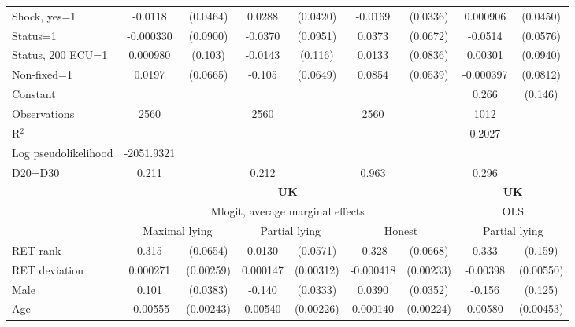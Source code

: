 \begin{tabular}{l|cccccc|cc}
Shock, yes=1    &  -0.0118         & (0.0464)&   0.0288         & (0.0420)&  -0.0169         & (0.0336)& 0.000906         & (0.0450)\\
Status=1        &-0.000330         & (0.0900)&  -0.0370         & (0.0951)&   0.0373         & (0.0672)&  -0.0514         & (0.0576)\\
Status, 200 ECU=1& 0.000980         &  (0.103)&  -0.0143         &  (0.116)&   0.0133         & (0.0836)&  0.00301         & (0.0940)\\
Non-fixed=1     &   0.0197         & (0.0665)&   -0.105         & (0.0649)&   0.0854         & (0.0539)&-0.000397         & (0.0812)\\
Constant        &                  &         &                  &         &                  &         &    0.266\sym{*}  &  (0.146)\\
\hline
Observations    &     2560         &         &     2560         &         &     2560         &         &     1012         &         \\
R$^2$      &                  &         &                  &         &                  &         &     0.2027      &   \\ 
Log pseudolikelihood  & -2051.9321   &         &                  &         &                  &         &           &   \\ 
D20=D30         &    0.211         &         &    0.212         &         &    0.963         &         &    0.296         &         \\
\hline\hline
&\multicolumn{6}{c|}{\bf UK}&\multicolumn{2}{c}{\bf UK}\\ &\multicolumn{6}{c|}{Mlogit, average marginal effects }&\multicolumn{2}{c}{OLS}\\
                &\multicolumn{2}{c}{Maximal lying}&\multicolumn{2}{c}{Partial lying}&\multicolumn{2}{c}{Honest}  &\multicolumn{2}{c}{Partial lying}\\
\hline
RET rank        &    0.315\sym{***}& (0.0654)&   0.0130         & (0.0571)&   -0.328\sym{***}& (0.0668)&    0.333\sym{**} &  (0.159)\\
RET deviation   & 0.000271         &(0.00259)& 0.000147         &(0.00312)&-0.000418         &(0.00233)& -0.00398         &(0.00550)\\
Male            &    0.101\sym{***}& (0.0383)&   -0.140\sym{***}& (0.0333)&   0.0390         & (0.0352)&   -0.156         &  (0.125)\\
Age             & -0.00555\sym{**} &(0.00243)&  0.00540\sym{**} &(0.00226)& 0.000140         &(0.00224)&  0.00580         &(0.00453)\\

\end{tabular}
